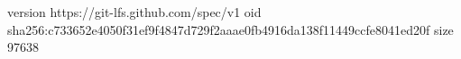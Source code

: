 version https://git-lfs.github.com/spec/v1
oid sha256:c733652e4050f31ef9f4847d729f2aaae0fb4916da138f11449ccfe8041ed20f
size 97638
